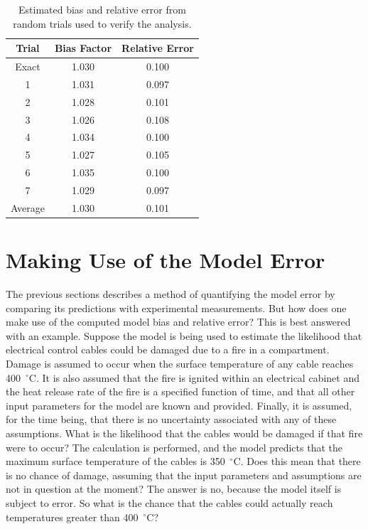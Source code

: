 \begin{table}[t]
\caption{Estimated bias and relative error from random trials used to verify the analysis. }
\begin{center}
\begin{tabular}{|c|c|c|}
\hline
Trial   & Bias Factor      & Relative Error \\ \hline \hline
Exact   & 1.030            &    0.100            \\ \hline \hline
1       & 1.031            &    0.097            \\ \hline
2       & 1.028            &    0.101            \\ \hline
3       & 1.026            &    0.108            \\ \hline
4       & 1.034            &    0.100            \\ \hline
5       & 1.027            &    0.105            \\ \hline
6       & 1.035            &    0.100            \\ \hline
7       & 1.029            &    0.097            \\ \hline \hline
Average & 1.030            &    0.101            \\ \hline
\end{tabular}
\end{center}
\label{trials}
\end{table}





\section{Making Use of the Model Error}

The previous sections describes a method of quantifying the model error by comparing its predictions with experimental measurements. But how does one make use of the computed
model bias and relative error? This is best answered with an example. Suppose the model is being used to estimate the likelihood that
electrical control cables could be damaged due to
a fire in a compartment. Damage is assumed to occur when the surface temperature of any cable reaches 400~$^\circ$C. It is also assumed that the fire is
ignited within an electrical cabinet and the heat release rate of the fire is a specified function of time, and that all other input
parameters for the model are known and provided. Finally, it is assumed, for the time being, that there is no uncertainty
associated with any of these assumptions. What is the likelihood that the cables would be damaged if that fire were to occur? The calculation is performed, and the
model predicts that the maximum surface temperature of the cables is 350~$^\circ$C. Does this mean that there is no chance of damage, assuming that the input parameters
and assumptions are not in question at the moment? The answer is no, because the model itself is subject to error. So what is the chance that the
cables could actually reach temperatures greater than 400~$^\circ$C?

